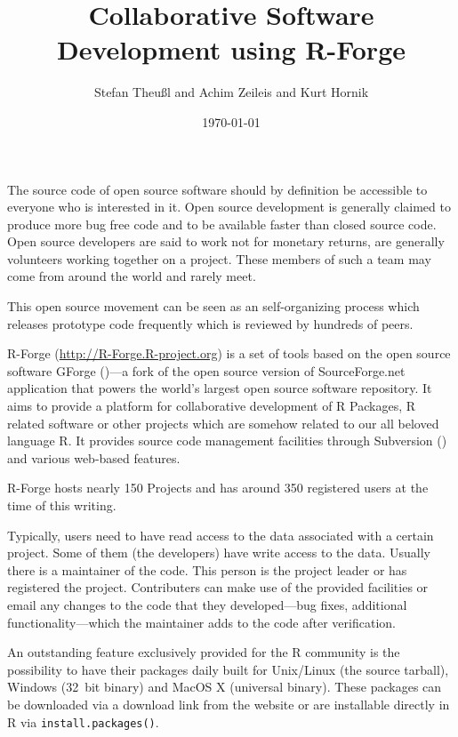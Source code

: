 \documentclass[12pt,a4paper]{article}
\title{Collaborative Software Development using R-Forge}
\author{Stefan Theu\ss{}l and Achim Zeileis and Kurt Hornik}
\date{\today}
\let\code=\texttt
\newcommand{\proglang}[1]{\textsf{#1}}
\begin{document}
\maketitle



The source code of open source software should by definition be accessible to
everyone who is interested in it. Open source development is
generally claimed to produce more bug free
code and to be available faster than closed source code. Open source
developers are said to work not for monetary returns, are generally
volunteers working together on a project. These members of such a
team may come from around the world and rarely meet.

This open source
movement can
be seen as an self-organizing process which releases prototype code
frequently which is reviewed by hundreds of peers.  


R-Forge (\url{http://R-Forge.R-project.org}) is a set of tools based
on the open source software GForge (\cite{manual:gforge})---a fork of
the open source version
of SourceForge.net application that powers the world's largest open
source software repository.%
It aims to provide a platform for collaborative development of
\proglang{R} Packages, \proglang{R} 
related software or other projects which are somehow related to our
all beloved language \proglang{R}. It provides source code management facilities
through Subversion (\cite{subversion07}) and various web-based features. 

R-Forge hosts nearly 150 Projects and has around 350 registered users at the
time of this writing.

Typically, users need to have read access to the data associated with
a certain project. Some of them (the developers) have write access to
the data. Usually there is a maintainer of the code. This person is the project
leader or has registered the project. Contributers can make use of the
provided facilities or email any changes to the code
that they developed---bug fixes, additional functionality---which the
maintainer adds to the code after verification.

An outstanding feature exclusively provided for the R community is the
possibility to have their packages daily built for Unix/Linux (the
source tarball), Windows (32~bit binary) and MacOS X (universal
binary). These packages can be 
downloaded via a download link from the website or are installable
directly in R via \code{install.packages()}.
\end{document}
